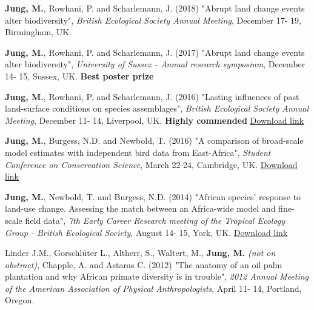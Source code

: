 \documentclass[12pt,a4paper,serif]{moderncv}        %
\begin{document}
\begin{bibenum}
    
    \item \textbf{Jung, M.}, Rowhani, P. and Scharlemann, J. (2018) "Abrupt land change events alter biodiversity", \emph{British Ecological Society Annual Meeting}, December 17- 19, Birmingham, UK. 
    
    \item \textbf{Jung, M.}, Rowhani, P. and Scharlemann, J. (2017) "Abrupt land change events alter biodiversity", \emph{University of Sussex - Annual research symposium}, December 14- 15, Sussex, UK. \textbf{Best poster prize}

    \item \textbf{Jung, M.}, Rowhani, P. and Scharlemann, J. (2016) "Lasting influences of past land-surface conditions on species assemblages", \emph{British Ecological Society Annual Meeting}, December 11- 14, Liverpool, UK. \textbf{Highly commended} \href{https://figshare.com/articles/Lasting_influences_of_past_land-surface_conditions_on_species_assemblages/7155029}{\underline{Download link}}

    \item \textbf{Jung, M.}, Burgess, N.D. and Newbold, T. (2016) "A comparison of broad-scale model estimates with independent bird data from East-Africa", \emph{Student Conference on Conservation Science}, March 22-24, Cambridge, UK. \href{https://figshare.com/articles/A_comparison_of_broad-scale_model_estimates_with_independent_bird_data_from_East-Africa/4231379}{\underline{Download link}}

    \item \textbf{Jung, M.}, Newbold, T. and Burgess, N.D. (2014) "African species' response to land-use change. Assessing the match between an Africa-wide model and fine-scale field data", \emph{7th Early Career Research meeting of the Tropical Ecology Group - British Ecological Society}, August 14- 15, York, UK. \href{https://figshare.com/articles/African_species_response_to_land_use_change_Assessing_the_match_between_an_Africa_wide_model_and_fine_scale_field_data/1613887}{\underline{Download link}}

    \item Linder J.M., Gorschl\"{u}ter L., Altherr, S., Waltert, M., \textbf{Jung, M.} {\small \emph{(not on abstract)}}, Chapple, A. and Astaras C. (2012) "The anatomy of an oil palm plantation and why African primate diversity is in trouble", \emph{2012 Annual Meeting of the American Association of Physical Anthropologists}, April 11- 14, Portland, Oregon.

\end{bibenum}
\end{document}
